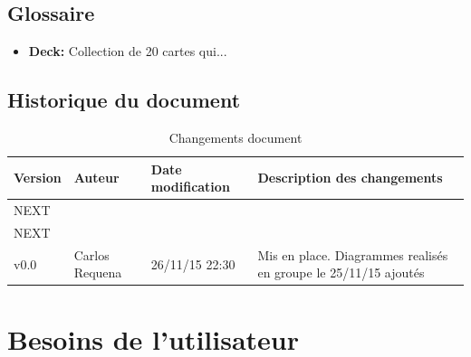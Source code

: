 \documentclass[11pt,a4paper]{article}
\begin{document}
\subsection{Glossaire}
\label{sec:glo}


\begin{itemize}
\item \textbf{Deck:} Collection de 20 cartes qui...
\end{itemize}

\subsection{Historique du document}
\label{sec:hist}






\begin{table}[h]
  \centering
  \begin{tabular}[ht]{|l|l|l|p{18em}|}
    \hline

    \textbf{Version}
    & \textbf{Auteur}
    & \textbf{Date modification}
    & \textbf{Description des changements}\\ \hline \hline
    NEXT &  &  &  \\ \hline
    NEXT &  &  &  \\ \hline
    v0.0 & Carlos Requena & 26/11/15 22:30
    & Mis en place. Diagrammes realisés en groupe le 25/11/15 ajoutés\\ \hline
  \end{tabular}
  \caption{Changements document}
  \label{tab:hist}
\end{table}

\section{Besoins de l'utilisateur}
\label{sec:besoins}

\end{document}
